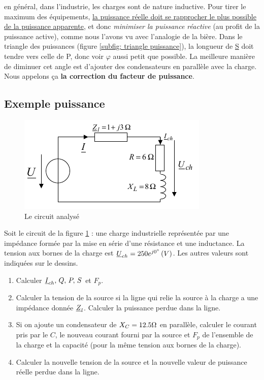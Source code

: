 \documentclass[12pt,a4paper]{article}
\newcommand{\uz}{\uline{Z} }
\newcommand{\ui}{\uline{I} }
\newcommand{\uu}{\uline{U} }
\newcommand{\us}{\uline{S} }
\begin{document}
 en général, dans l'industrie, les charges sont de nature inductive. Pour tirer le maximum des équipements, \uline{la puissance réelle doit se rapprocher le plus possible de la puissance apparente}, et donc \textit{minimiser la puissance réactive} (au profit de la puissance active), comme nous l'avons vu avec l'analogie de la bière. Dans le triangle des puissances (figure \ref{subfig: triangle puissance}), la longueur de \us doit tendre vers celle de P, donc voir $\varphi$ aussi petit que possible. La meilleure manière de diminuer cet angle est d'ajouter des condensateurs en parallèle avec la charge. Nous appelons ça \textbf{la correction du facteur de puissance}.
\subsection{Exemple puissance}
\begin{figure}
	\centering
	\includegraphics[scale=1]{images/exemple_puissance}
	\caption{Le circuit analysé}
	\label{fig: exemple puissance}
\end{figure}
Soit le circuit de la figure \ref{fig: exemple puissance} : une charge industrielle représentée par une impédance formée par la mise en série d'une résistance et une inductance. La tension aux bornes de la charge est $\uu_{ch} = 250e^{j0\degre}\, (V)$. Les autres valeurs sont indiquées sur le dessins. 
\begin{enumerate}[label=\alph*)]
	\item	Calculer $\ui_{ch},\, Q,\, P,\, S$ et $F_p$.
	\item 	Calculer la tension de la source si la ligne qui relie la source à la charge a une impédance donnée $\uz_l$. Calculer la puissance perdue dans la ligne.
	\item	Si on ajoute un condensateur de $X_C = 12.5 \ohm$ en parallèle, calculer le courant pris par le $C$, le nouveau courant fourni par la source et $F_p$ de l'ensemble de la charge et la capacité (pour la même tension aux bornes de la charge).
	\item 	Calculer la nouvelle tension de la source et la nouvelle valeur de puissance réelle perdue dans la ligne.
\end{enumerate}
\end{document}
